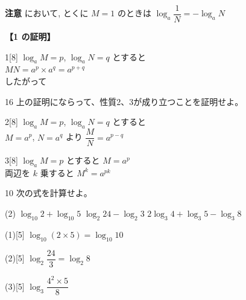 \documentclass[14pt,dvipdfmx]{jsarticle}
\begin{document}
\vspace{0.08em}
\textbf{注意} において, とくに $M=1$ のときは\quad
{\boldmath $\log_{a} \dfrac{1}{N} = -\log_{a} N$}

\vfill
\nextpage

\vspace{-1.5zw}%
\textbf{【1 の証明】}
\begin{answerbox}{1}[8]
  $\log_{a} M = p$, $\log_{a} N = q$ とすると\\
  $MN = a^{p} \times a^{q} = a^{p+q}$\\
  したがって
\end{answerbox}

\begin{practiceprob}{16}
  上の証明にならって、性質2、3が成り立つことを証明せよ。
\end{practiceprob}

\begin{answerbox}{2}[8]
  $\log_{a} M = p$, $\log_{a} N = q$ とすると\\
  $M = a^{p}$, $N = a^{q}$ より $\dfrac{M}{N} = a^{p-q}$
\end{answerbox}
\begin{answerbox}{3}[8]
  $\log_{a} M = p$ とすると $M = a^{p}$\\
  両辺を $k$ 乗すると $M^{k} = a^{pk}$
\end{answerbox}
\vspace{1em}

\begin{exampleprob}{10}
  次の式を計算せよ。
  \begin{tasks}[label=(\arabic*), label-width=1.6zw, item-indent=2zw, after-item-skip=0.1em](2)
    \task $\log_{10} 2 + \log_{10} 5$
    \task $\log_{2} 24 - \log_{2} 3$
    \task $2\log_{3} 4 + \log_{3} 5 - \log_{3} 8$
  \end{tasks}
\end{exampleprob}

\begin{answerbox}{(1)}[5]
  $\log_{10}(2 \times 5) = \log_{10} 10$
\end{answerbox}
\begin{answerbox}{(2)}[5]
  $\log_{2} \dfrac{24}{3} = \log_{2} 8$
\end{answerbox}
\begin{answerbox}{(3)}[5]
  $\log_{3} \dfrac{4^{2} \times 5}{8}$
\end{answerbox}
\end{document}
